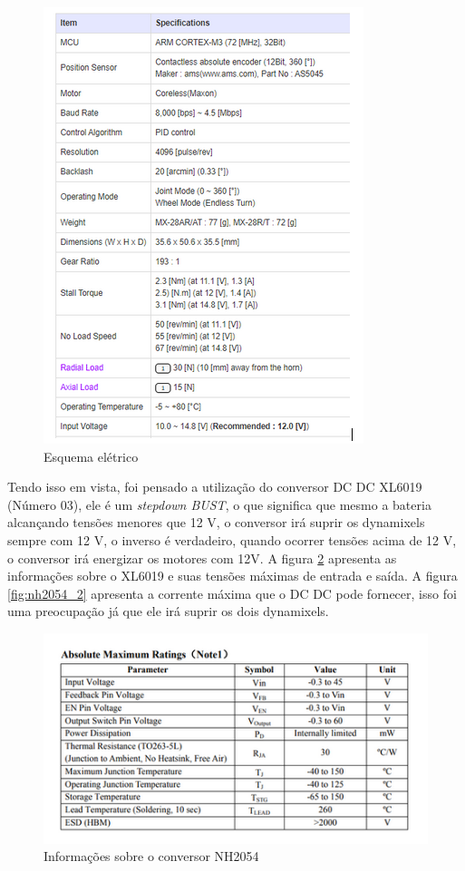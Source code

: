  \begin{figure}[H]
 	\centering
 	\includegraphics[scale=0.7, angle=0]{Figures/dynamixel_config.png}
 	\caption{Esquema elétrico}
 	\label{fig:dyna_config}
 \end{figure}
 
 Tendo isso em vista, foi pensado a utilização do conversor DC DC XL6019 (Número 03), ele é um \textit{stepdown BUST}, o que significa que mesmo a bateria alcançando tensões menores que 12 V, o conversor irá suprir os dynamixels sempre com 12 V, o inverso é verdadeiro, quando ocorrer tensões acima de 12 V, o conversor irá energizar os motores com 12V. A figura \ref{fig:nh2054_1} apresenta as informações sobre o XL6019 e suas tensões máximas de entrada e saída. A figura \ref{fig:nh2054_2} apresenta a corrente máxima que o DC DC pode fornecer, isso foi uma preocupação já que ele irá suprir os dois dynamixels.
 
  \begin{figure}[H]
  	\centering
  	\includegraphics[scale=0.7, angle=0]{Figures/NH2054_1.png}
  	\caption{Informações sobre o conversor NH2054}
  	\label{fig:nh2054_1}
  \end{figure}
  
